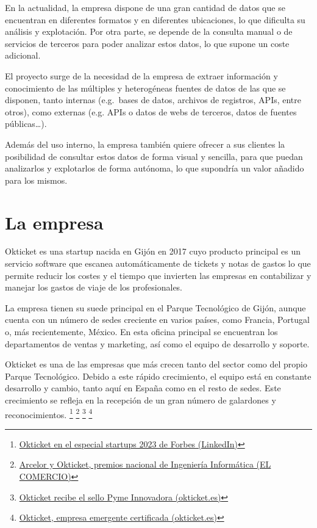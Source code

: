 En la actualidad, la empresa dispone de una gran cantidad de datos que se encuentran en
diferentes formatos y en diferentes ubicaciones, lo que dificulta su análisis y explotación.
Por otra parte, se depende de la consulta manual o de servicios de terceros para poder analizar
estos datos, lo que supone un coste adicional.

El proyecto surge de la necesidad de la empresa de extraer información y conocimiento de las
múltiples y heterogéneas fuentes de datos de las que se disponen, tanto internas (e.g.~bases de
datos, archivos de registros, APIs, entre otros), como externas (e.g. APIs o datos de webs de
terceros, datos de fuentes públicas\ldots).

Además del uso interno, la empresa también quiere ofrecer a sus clientes la posibilidad de
consultar estos datos de forma visual y sencilla, para que puedan analizarlos y explotarlos de
forma autónoma, lo que supondría un valor añadido para los mismos.

\newpage{}
\section{La empresa}\label{sec:empresa}
Okticket es una startup nacida en Gijón en 2017 cuyo producto principal es un servicio software que escanea
automáticamente de tickets y notas de gastos lo que permite reducir los costes y el tiempo que invierten
las empresas en contabilizar y manejar los gastos de viaje de los profesionales.

La empresa tienen su suede principal en el Parque Tecnológico de Gijón, aunque cuenta con un número
de sedes creciente en varios países, como Francia, Portugal o, más recientemente, México. En esta
oficina principal se encuentran los departamentos de ventas y marketing, así como el equipo de
desarrollo y soporte.

Okticket es una de las empresas que más crecen tanto del sector como del propio Parque
Tecnológico. Debido a este rápido crecimiento, el equipo está en constante desarrollo y
cambio, tanto aquí en España como en el resto de sedes. Este crecimiento se refleja
en la recepción de un gran número de galardones y reconocimientos.
\footnote{\href{https://www.linkedin.com/posts/okticket_okticket-en-el-especial-startups-de-forbes-activity-7140622980618903552-UGWK}{Okticket en el especial startups 2023 de Forbes (LinkedIn)}}
\footnote{\href{https://www.elcomercio.es/economia/arcelor-okticket-premios-20230222002438-ntvo.html}{Arcelor y Okticket, premios nacional de Ingeniería Informática (EL COMERCIO)}}
\footnote{\href{https://www.okticket.es/blog/empresa-pyme-innovadora}{Okticket recibe el sello Pyme Innovadora (okticket.es)}}
\footnote{\href{https://www.okticket.es/blog/okticket-empresa-emergente-certificada}{Okticket, empresa emergente certificada (okticket.es)}}

